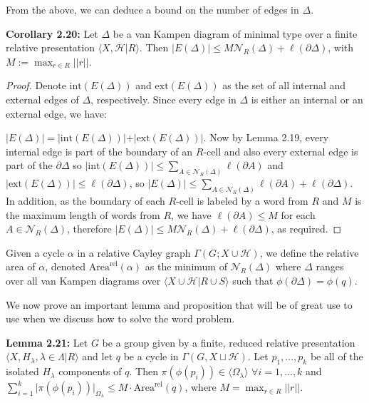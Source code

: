 \documentclass[12pt]{article}
\newcommand{\vs}{\vskip10pt}
\begin{document}
	From the above, we can deduce a bound on the number of edges in $\Delta$.
	
	\vs
	
	\textbf{Corollary 2.20: } Let $\Delta$ be a van Kampen diagram of minimal type over a finite relative presentation $\langle X, \mathcal{H} \vert R \rangle$. Then $\vert E(\Delta) \vert\leq M \mathcal{N}_R(\Delta) + \ell(\partial \Delta)$, with $M := \max_{r \in R} \vert \vert r \vert \vert$. 
	
	\begin{proof}
		
		Denote $\text{int}(E(\Delta))$ and $\text{ext}(E(\Delta))$ as the set of all internal and external edges of $\Delta$, respectively. Since every edge in $\Delta$ is either an internal or an external edge, we have: 
		
		\vs
		
		$\vert E(\Delta) \vert = \vert \text{int}(E(\Delta)) \vert + \vert \text{ext}(E(\Delta)) \vert$. Now by Lemma 2.19, every internal edge is part of the boundary of an $R$-cell and also every external edge is part of the $\partial \Delta$ so $\vert \text{int}(E(\Delta)) \vert \leq \sum_{A \in \mathcal{N}_R(\Delta)} \ell(\partial A)$ and $\vert \text{ext}(E(\Delta)) \vert \leq \ell(\partial \Delta)$, so $\vert E(\Delta) \vert \leq \sum_{A \in \mathcal{N}_R(\Delta)} \ell(\partial A) + \ell(\partial \Delta)$. In addition, as the boundary of each $R$-cell is labeled by a word from $R$ and $M$ is the maximum length of words from $R$, we have $\ell(\partial A) \leq M$ for each $A \in \mathcal{N}_R(\Delta)$, therefore $\vert E(\Delta) \vert \leq M \mathcal{N}_R(\Delta) + \ell(\partial \Delta)$, as required. 
		
	\end{proof}
	
	\vs
	
	Given a cycle $\alpha$ in a relative Cayley graph $\Gamma(G; X \cup \mathcal{H})$, we define the relative area of $\alpha$, denoted $\text{Area}^{\text{rel}} (\alpha)$ as the minimum of $\mathcal{N}_R(\Delta)$ where $\Delta$ ranges over all van Kampen diagrams over $\langle X \cup \mathcal{H} \vert R \cup S \rangle$ such that $\phi(\partial \Delta) = \phi(q)$. 
	
	\vs 
	
	We now prove an important lemma and proposition that will be of great use to use when we discuss how to solve the word problem. 
	
	\vs 
	
	\textbf{Lemma 2.21: } Let $G$ be a group given by a finite, reduced relative presentation $\langle X, H_{\lambda}, \lambda \in \Lambda \vert R \rangle$ and let $q$ be a cycle in $\Gamma(G, X \sqcup \mathcal{H})$. Let $p_1,...,p_k$ be all of the isolated $H_{\lambda}$ components of $q$. Then $\pi(\phi(p_i)) \in \langle \Omega_{\lambda} \rangle$ $\forall i =1,...,k$ and $\sum_{i=1}^k \vert \pi(\phi(p_i)) \vert_{\Omega_{\lambda}} \leq M \cdot \text{Area}^{\text{rel}}(q)$, where $M = \max_{r \in R} \vert \vert r \vert \vert$.
	
\end{document}

